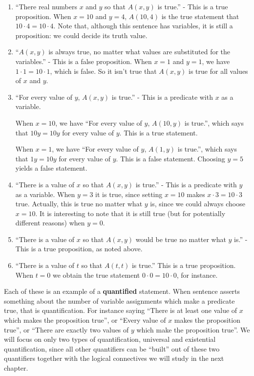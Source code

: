 \begin{solutions}
		\begin{enumerate}
			\item ``There real numbers $x$ and $y$ so that $A(x,y)$ is true.'' - This is a true proposition.  When $x = 10$ and $y = 4$, $A(10,4)$ is the true statement that $10 \cdot 4 = 10 \cdot 4$.  Note that, although this sentence has variables, it is still a proposition:  we could decide its truth value.
			\item ``$A(x,y)$ is always true, no matter what values are substituted for the variables.'' - This is a false proposition.  When $x = 1$ and $y = 1$, we have $1 \cdot 1 = 10 \cdot 1$, which is false.  So it isn't true that $A(x,y)$ is true for all values of $x$ and $y$.
			\item  ``For every value of  $y$,  $A(x,y)$ is true.'' - This is a predicate with $x$ as a variable.  
			
			When $x = 10$, we have ``For every value of  $y$,  $A(10,y)$ is true.'', which says that $10y = 10y$ for every value of $y$.  This is a true statement.
			
			When $x = 1$, we have ``For every value of  $y$,  $A(1,y)$ is true.'', which says that $1y = 10y$ for every value of $y$.  This is a false statement.  Choosing $y = 5$ yields a false statement.
			\item ``There is a value of $x$ so that $A(x,y)$ is true.'' - This is a predicate with $y$ as a variable.  When $y = 3$ it is true, since setting $x = 10$ makes $x \cdot 3 = 10 \cdot 3$ true.  Actually, this is true no matter what $y$ is, since we could always choose $x=10$.  It is interesting to note that it is still true (but for potentially different reasons) when $y = 0$.
			\item ``There is a value of $x$ so that $A(x,y)$ would be true no matter what $y$ is.'' - This is a true proposition, as noted above. 
			\item ``There is a value of $t$ so that $A(t,t)$ is true.''  This is a true proposition.  When $t = 0$ we obtain the true statement $0 \cdot 0 = 10 \cdot 0$, for instance.
		\end{enumerate}
	\end{solutions}

Each of these is an example of a \textbf{quantified} statement.  When sentence asserts something about the number of variable assignments which make a predicate true, that is quantification.  For instance saying ``There is at least one value of $x$ which makes the proposition true'', or ``Every value of $x$ makes the proposition true'', or ``There are exactly two values of $y$ which make the proposition true''.  We will focus on only two types of quantification, universal and existential quantification, since all other quantifiers can be ``built'' out of these two quantifiers together with the logical connectives we will study in the next chapter.

